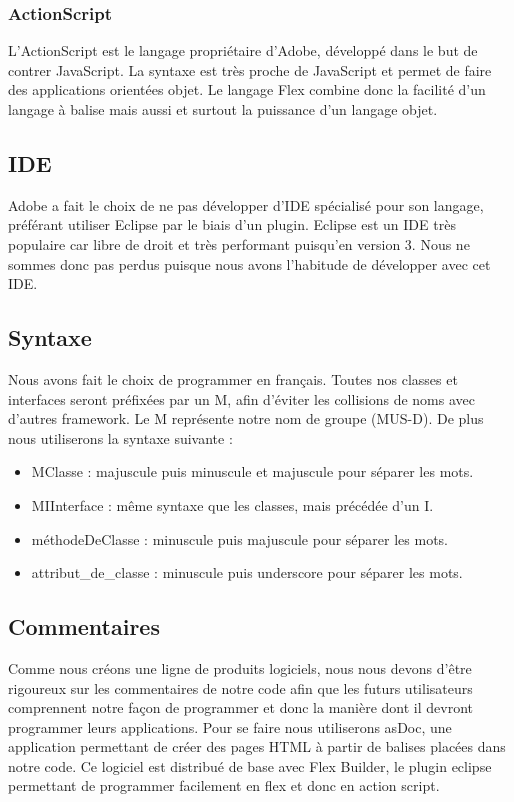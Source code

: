 \documentclass{article}
\begin{document}
		\subsubsection{ActionScript}
			L'ActionScript est le langage propriétaire d'Adobe, développé dans le but de contrer JavaScript. La syntaxe est très proche de JavaScript et permet de faire des applications orientées objet. Le langage Flex combine donc la facilité d'un langage à balise mais aussi et surtout la puissance d'un langage objet.
	\subsection{IDE}
		Adobe a fait le choix de ne pas développer d'IDE spécialisé pour son langage, préférant utiliser Eclipse par le biais d'un plugin. Eclipse est un IDE très populaire car libre de droit et très performant puisqu'en version 3. Nous ne sommes donc pas perdus puisque nous avons l'habitude de développer avec cet IDE.
	\subsection{Syntaxe}
		Nous avons fait le choix de programmer en français. Toutes nos classes et interfaces seront préfixées par un M, afin d'éviter les collisions de noms avec d'autres framework. Le M représente notre nom de groupe (MUS-D).
		\ident De plus nous utiliserons la syntaxe suivante :
		\begin{itemize}
			\item MClasse : majuscule puis minuscule et majuscule pour séparer les mots.
			\item MIInterface : même syntaxe que les classes, mais précédée d'un I.
			\item méthodeDeClasse : minuscule puis majuscule pour séparer les mots.
			\item attribut\_de\_classe : minuscule puis underscore pour séparer les mots.
		\end{itemize}
		
	\subsection{Commentaires}
		Comme nous créons une ligne de produits logiciels, nous nous devons d'être rigoureux sur les commentaires de notre code afin que les futurs utilisateurs comprennent notre façon de programmer et donc la manière dont il devront programmer leurs applications.
		\indent Pour se faire nous utiliserons asDoc, une application permettant de créer des pages HTML à partir de balises placées dans notre code. Ce logiciel est distribué de base avec Flex Builder, le plugin eclipse permettant de programmer facilement en flex et donc en action script.
\end{document}
